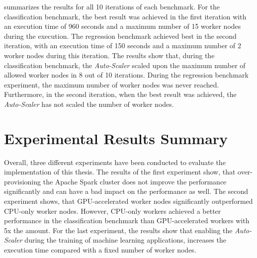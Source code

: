  summarizes the results for all 10 iterations of each benchmark.
For the classification benchmark, the best result was achieved in the first iteration with an execution time of 960 seconds and a maximum number of 15 worker nodes during the execution.
The regression benchmark achieved best in the second iteration, with an execution time of 150 seconds and a maximum number of 2 worker nodes during this iteration.
The results show that, during the classification benchmark, the \textit{Auto-Scaler} scaled upon the maximum number of allowed worker nodes in 8 out of 10 iterations. During the regression benchmark experiment, the maximum number of worker nodes was never reached. Furthermore, in the second iteration, when the best result was achieved, the \textit{Auto-Scaler} has not scaled the number of worker nodes.


\section{Experimental Results Summary}
Overall, three different experiments have been conducted to evaluate the implementation of this thesis.
The results of the first experiment show, that over-provisioning the Apache Spark cluster does not improve the performance significantly and can have a bad impact on the performance as well.
The second experiment shows, that GPU-accelerated worker nodes significantly outperformed CPU-only worker nodes. However, CPU-only workers achieved a better performance in the classification benchmark than GPU-accelerated workers with 5x the amount.
For the last experiment, the results show that enabling the \textit{Auto-Scaler} during the training of machine learning applications, increases the execution time compared with a fixed number of worker nodes.
